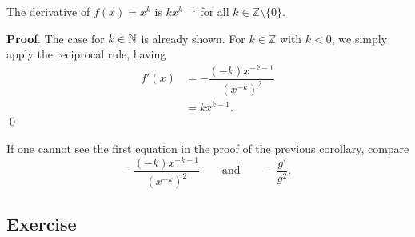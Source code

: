 \documentclass[11pt]{book}
\begin{document}
\begin{corollary}
    The derivative of $f(x)=x^k$ is $kx^{k-1}$ for all $k\in\mathbb{Z}\setminus\{0\}$.
\end{corollary}
\textbf{Proof}. The case for $k\in\mathbb{N}$ is already shown. For $k\in\mathbb{Z}$ with $k<0$, we simply apply the reciprocal rule, having \begin{align*}
    f'(x)&=-\dfrac{(-k)x^{-k-1}}{(x^{-k})^2}\\
    &=kx^{k-1}.
\end{align*} \qed

If one cannot see the first equation in the proof of the previous corollary, compare $$-\dfrac{(-k)x^{-k-1}}{(x^{-k})^2}\qquad\text{and}\qquad-\dfrac{g'}{g^2}.$$

\subsection*{Exercise}
\end{document}
